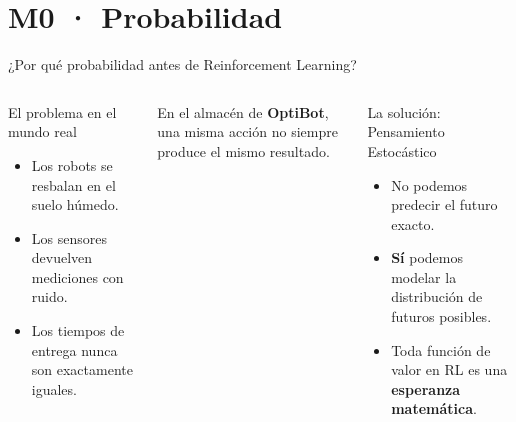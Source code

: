 \section{M0 · Probabilidad}

\begin{frame}{¿Por qué probabilidad antes de Reinforcement Learning?}
  \begin{columns}[T,onlytextwidth]
      \begin{block}{El problema en el mundo real}
        \begin{itemize}
          \item Los robots se resbalan en el suelo húmedo.
          \item Los sensores devuelven mediciones con ruido.
          \item Los tiempos de entrega nunca son exactamente iguales.
        \end{itemize}
      \end{block}
      \vspace{0.2cm}
      \small En el almacén de \textbf{OptiBot}, una misma acción no siempre produce el mismo resultado.
      \begin{alertblock}{La solución: Pensamiento Estocástico}
        \begin{itemize}
          \item No podemos predecir el futuro exacto.
          \item \textbf{Sí} podemos modelar la distribución de futuros posibles.
          \item Toda función de valor en RL es una \textbf{esperanza matemática}.
        \end{itemize}
      \end{alertblock}
  \end{columns}
  \vspace{0.4cm}
\end{frame}


